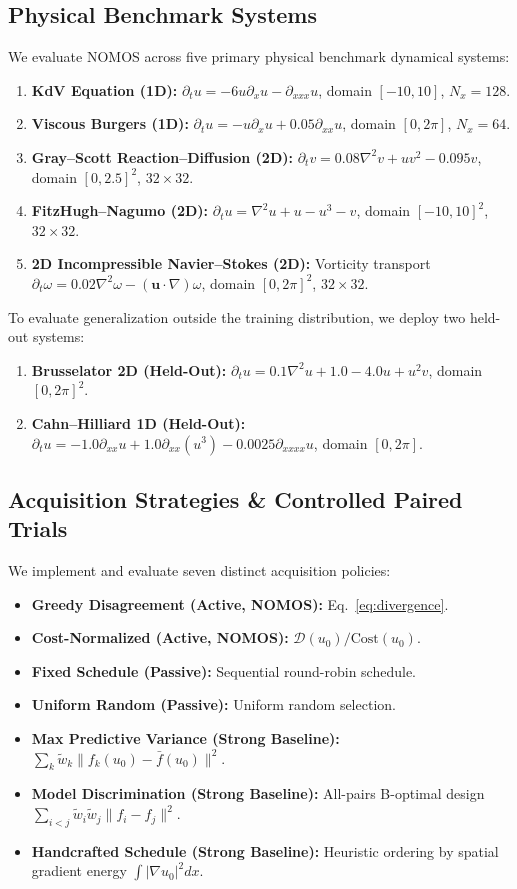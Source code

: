 \documentclass[twocolumn,10pt,a4paper]{article}
\begin{document}
\subsection{Physical Benchmark Systems}
We evaluate NOMOS across five primary physical benchmark dynamical systems:
\begin{enumerate}
    \item \textbf{KdV Equation (1D):} $\partial_t u = -6 u \partial_x u - \partial_{xxx} u$, domain $[-10, 10]$, $N_x=128$.
    \item \textbf{Viscous Burgers (1D):} $\partial_t u = -u \partial_x u + 0.05 \partial_{xx} u$, domain $[0, 2\pi]$, $N_x=64$.
    \item \textbf{Gray--Scott Reaction--Diffusion (2D):} $\partial_t v = 0.08 \nabla^2 v + u v^2 - 0.095 v$, domain $[0, 2.5]^2$, $32 \times 32$.
    \item \textbf{FitzHugh--Nagumo (2D):} $\partial_t u = \nabla^2 u + u - u^3 - v$, domain $[-10, 10]^2$, $32 \times 32$.
    \item \textbf{2D Incompressible Navier--Stokes (2D):} Vorticity transport $\partial_t \omega = 0.02 \nabla^2 \omega - (\mathbf{u} \cdot \nabla)\omega$, domain $[0, 2\pi]^2$, $32 \times 32$.
\end{enumerate}

To evaluate generalization outside the training distribution, we deploy two held-out systems:
\begin{enumerate}
    \item \textbf{Brusselator 2D (Held-Out):} $\partial_t u = 0.1 \nabla^2 u + 1.0 - 4.0 u + u^2 v$, domain $[0, 2\pi]^2$.
    \item \textbf{Cahn--Hilliard 1D (Held-Out):} $\partial_t u = -1.0 \partial_{xx} u + 1.0 \partial_{xx}(u^3) - 0.0025 \partial_{xxxx} u$, domain $[0, 2\pi]$.
\end{enumerate}

\subsection{Acquisition Strategies \& Controlled Paired Trials}
We implement and evaluate seven distinct acquisition policies:
\begin{itemize}
    \item \textbf{Greedy Disagreement (Active, NOMOS):} Eq.~\eqref{eq:divergence}.
    \item \textbf{Cost-Normalized (Active, NOMOS):} $\mathcal{D}(u_0) / \text{Cost}(u_0)$.
    \item \textbf{Fixed Schedule (Passive):} Sequential round-robin schedule.
    \item \textbf{Uniform Random (Passive):} Uniform random selection.
    \item \textbf{Max Predictive Variance (Strong Baseline):} $\sum_k \tilde{w}_k \| f_k(u_0) - \bar{f}(u_0) \|^2$.
    \item \textbf{Model Discrimination (Strong Baseline):} All-pairs B-optimal design $\sum_{i < j} \tilde{w}_i \tilde{w}_j \| f_i - f_j \|^2$.
    \item \textbf{Handcrafted Schedule (Strong Baseline):} Heuristic ordering by spatial gradient energy $\int |\nabla u_0|^2 dx$.
\end{itemize}
\end{document}
